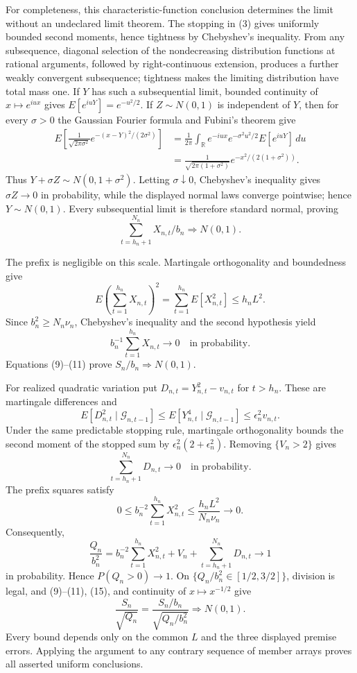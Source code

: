 For completeness, this characteristic-function conclusion determines the limit without an undeclared limit theorem. The stopping in (3) gives uniformly bounded second moments, hence tightness by Chebyshev's inequality. From any subsequence, diagonal selection of the nondecreasing distribution functions at rational arguments, followed by right-continuous extension, produces a further weakly convergent subsequence; tightness makes the limiting distribution have total mass one. If \(Y\) has such a subsequential limit, bounded continuity of \(x\mapsto e^{iux}\) gives \(E[e^{iuY}]=e^{-u^2/2}\). If \(Z\sim N(0,1)\) is independent of \(Y\), then for every \(\sigma>0\) the Gaussian Fourier formula and Fubini's theorem give
\[
\begin{aligned}
 E\!\left[\frac1{\sqrt{2\pi\sigma^2}}
 e^{-(x-Y)^2/(2\sigma^2)}\right]
 &=\frac1{2\pi}\int_{\mathbb R}e^{-iux}
 e^{-\sigma^2u^2/2}E[e^{iuY}]\,du\\
 &=\frac1{\sqrt{2\pi(1+\sigma^2)}}
 e^{-x^2/(2(1+\sigma^2))}.
\end{aligned}
\tag{8}
\]
Thus \(Y+\sigma Z\sim N(0,1+\sigma^2)\). Letting \(\sigma\downarrow0\), Chebyshev's inequality gives \(\sigma Z\to0\) in probability, while the displayed normal laws converge pointwise; hence \(Y\sim N(0,1)\). Every subsequential limit is therefore standard normal, proving
\[
 \sum_{t=h_n+1}^{N_n}X_{n,t}/b_n\Rightarrow N(0,1).
\tag{9}
\]

The prefix is negligible on this scale. Martingale orthogonality and boundedness give
\[
 E\left(\sum_{t=1}^{h_n}X_{n,t}\right)^2
 =\sum_{t=1}^{h_n}E[X_{n,t}^2]\le h_nL^2.
\tag{10}
\]
Since \(b_n^2\ge N_n\nu_n\), Chebyshev's inequality and the second hypothesis yield
\[
 b_n^{-1}\sum_{t=1}^{h_n}X_{n,t}\longrightarrow0
 \quad\text{in probability}.
\tag{11}
\]
Equations (9)--(11) prove \(S_n/b_n\Rightarrow N(0,1)\).

For realized quadratic variation put \(D_{n,t}=Y_{n,t}^2-v_{n,t}\) for \(t>h_n\). These are martingale differences and
\[
 E[D_{n,t}^2\mid\mathcal G_{n,t-1}]
 \le E[Y_{n,t}^4\mid\mathcal G_{n,t-1}]
 \le\epsilon_n^2v_{n,t}.
\tag{12}
\]
Under the same predictable stopping rule, martingale orthogonality bounds the second moment of the stopped sum by \(\epsilon_n^2(2+\epsilon_n^2)\). Removing \(\{V_n>2\}\) gives
\[
 \sum_{t=h_n+1}^{N_n}D_{n,t}\longrightarrow0
 \quad\text{in probability}.
\tag{13}
\]
The prefix squares satisfy
\[
 0\le b_n^{-2}\sum_{t=1}^{h_n}X_{n,t}^2
 \le\frac{h_nL^2}{N_n\nu_n}\longrightarrow0.
\tag{14}
\]
Consequently,
\[
 \frac{Q_n}{b_n^2}
 =b_n^{-2}\sum_{t=1}^{h_n}X_{n,t}^2+V_n
 +\sum_{t=h_n+1}^{N_n}D_{n,t}
 \longrightarrow1
\tag{15}
\]
in probability. Hence \(P(Q_n>0)\to1\). On \(\{Q_n/b_n^2\in[1/2,3/2]\}\), division is legal, and (9)--(11), (15), and continuity of \(x\mapsto x^{-1/2}\) give
\[
 \frac{S_n}{\sqrt{Q_n}}
 =\frac{S_n/b_n}{\sqrt{Q_n/b_n^2}}\Rightarrow N(0,1).
\tag{16}
\]
Every bound depends only on the common \(L\) and the three displayed premise errors. Applying the argument to any contrary sequence of member arrays proves all asserted uniform conclusions.
